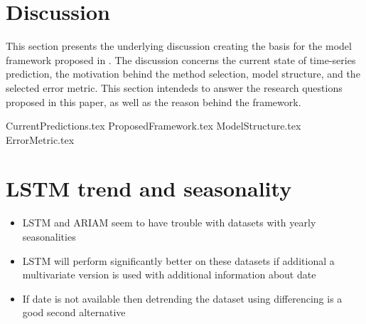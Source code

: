 
\section{Discussion}
\label{section:Discussion:Discussion}


This section presents the underlying discussion creating the basis for the model framework proposed in .
The discussion concerns the current state of time-series prediction, the motivation behind the method selection, model structure, and the selected error metric.
This section intendeds to answer the research questions proposed in this paper,
as well as the reason behind the framework.


{CurrentPredictions.tex}
{ProposedFramework.tex}
{ModelStructure.tex}
{ErrorMetric.tex}

\section{LSTM trend and seasonality}
\begin{itemize}
  \item LSTM and ARIAM seem to have trouble with datasets with yearly seasonalities
  \item {LSTM will perform significantly better on these datasets if additional
        a multivariate version is used with additional information about date}
  \item {If date is not available then detrending the dataset using differencing is a good second alternative}
\end{itemize}

